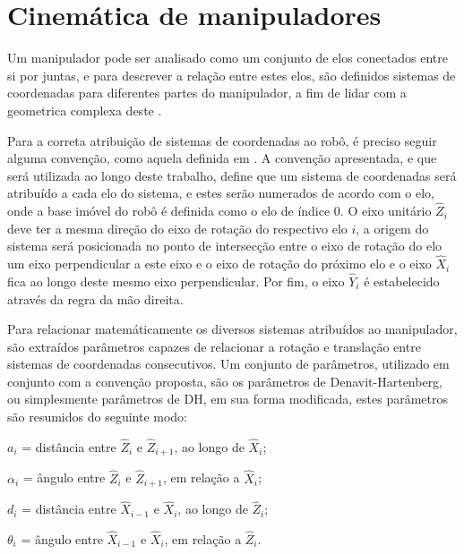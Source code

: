 

\section{Cinemática de manipuladores}
Um manipulador pode ser analisado como um conjunto de elos conectados
entre si por juntas, e para descrever a relação entre estes elos, 
são definidos sistemas de coordenadas para diferentes partes do 
manipulador, a fim de lidar com a geometrica complexa deste \cite{craig2009introduction}.

Para a correta atribuição de sistemas de coordenadas ao robô, é 
preciso seguir alguma convenção, como aquela definida em \cite{craig2009introduction}.
A convenção apresentada, e que será utilizada ao longo deste trabalho,
define que um sistema de coordenadas será atribuído a cada elo do sistema,
e estes serão numerados de acordo com o elo, onde a base imóvel do robô
é definida como o elo de índice 0. O eixo unitário $\hat{Z}_i$ deve ter a mesma
direção do eixo de rotação do respectivo elo $i$, a origem do sistema 
será posicionada no ponto de intersecção entre o eixo de rotação do elo
um eixo perpendicular a este eixo e o eixo de rotação do próximo elo e o 
eixo $\hat{X}_i$ fica ao longo deste mesmo eixo perpendicular. Por fim, 
o eixo $\hat{Y}_i$ é estabelecido através da regra da mão direita.

Para relacionar matemáticamente os diversos sistemas atribuídos ao 
manipulador, são extraídos parâmetros capazes de relacionar a rotação
e translação entre sistemas de coordenadas consecutivos. Um 
conjunto de parâmetros, utilizado em conjunto com a convenção proposta,
são os parâmetros de Denavit-Hartenberg, ou simplesmente parâmetros de 
DH, em sua forma modificada, estes parâmetros são resumidos do seguinte
modo:

\begin{itemize}
    \begin{centering}
    \item[] $a_i$ = distância entre $\hat{Z}_i$ e $\hat{Z}_{i+1}$, ao longo de $\hat{X}_i$;
    \item[] $\alpha_i$ = ângulo entre $\hat{Z}_i$ e $\hat{Z}_{i+1}$, em relação a $\hat{X}_i$;
    \item[] $d_i$ = distância entre $\hat{X}_{i-1}$ e $\hat{X}_i$, ao longo de $\hat{Z}_i$;
    \item[] $\theta_i$ = ângulo entre $\hat{X}_{i-1}$ e $\hat{X}_i$, em relação a $\hat{Z}_i$.
    \par\end{centering}
\end{itemize}

